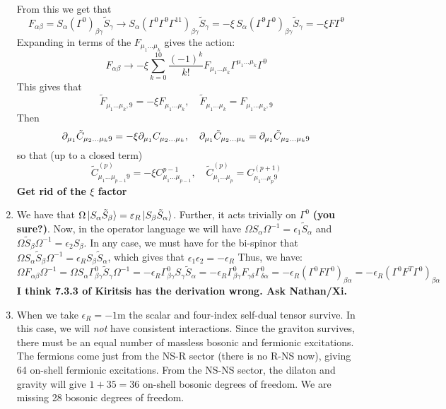 \documentclass[11pt, class=article, crop=false]{standalone}
\begin{document}
\begin{enumerate}
	From this we get that 
	\[
		F_{\alpha \beta} = S_{\alpha} (\Gamma^{0})_{\beta \gamma} \tilde S_\gamma \to S_{\alpha} (\Gamma^{0} \Gamma^{9} \Gamma^{11})_{\beta \gamma} \tilde S_\gamma = - \xi \, S_{\alpha} (\Gamma^{9} \Gamma^{0})_{\beta \gamma} \tilde S_\gamma = - \xi F \Gamma^{9}
	\]
	Expanding in terms of the $F_{\mu_1 \dots \mu_k}$ gives the action:
	\[
		F_{\alpha \beta} \to - \xi \sum_{k=0}^{10} \frac{(-1)^k}{k!} F_{\mu_1 \dots \mu_k} \Gamma^{\mu_1 \dots \mu_k} \Gamma^{9}
	\]
	This gives that
	\[
		\tilde F_{\mu_1 \dots \mu_k, 9} = - \xi F_{\mu_1 \dots \mu_k}, \quad \tilde F_{\mu_1 \dots \mu_k} = F_{\mu_1 \dots \mu_k, 9}
	\]
	Then
	\[
		\partial_{\mu_1} \tilde C_{\mu_2 \dots \mu_k 9} = -\xi \partial_{\mu_1} C_{\mu_2 \dots \mu_k}, \quad \partial_{\mu_1} \tilde C_{\mu_2 \dots \mu_k} = \partial_{\mu_1} \tilde C_{\mu_2 \dots \mu_k 9}
	\]
	so that (up to a closed term)
	\[
		\tilde C_{\mu_1 \dots \mu_{p-1} 9}^{(p)} = -\xi C_{\mu_1 \dots \mu_{p-1}}^{p-1}, \quad \tilde C^{(p)}_{\mu_1 \dots \mu_p} = C^{(p+1)}_{\mu_1 \dots \mu_p 9}
	\]
	\textbf{Get rid of the $\xi$ factor}
	
	\item We have that $\Omega \ket{S_\alpha \tilde S_\beta} = \varepsilon_R \ket{S_\beta \tilde S_\alpha}$. Further, it acts trivially on $\Gamma^0$ \textbf{(you sure?)}. Now, in the operator language we will have $\Omega S_\alpha \Omega^{-1} = \epsilon_1 \tilde S_\alpha$ and $\Omega \tilde S_\beta \Omega^{-1} = \epsilon_2 S_\beta$. In any case, we must have for the bi-spinor that $\Omega S_\alpha \tilde S_\beta \Omega^{-1} = \epsilon_R S_\beta \tilde S_\alpha$, which gives that $\epsilon_1 \epsilon_2 = -\epsilon_R$ Thus, we have:
	\[
		\Omega F_{\alpha \beta} \Omega^{-1} = \Omega S_\alpha \Gamma^0_{\beta \gamma} \tilde S_\gamma \Omega^{-1} = - \epsilon_R \Gamma^0_{\beta \gamma} S_{\gamma} \tilde S_\alpha = - \epsilon_R \Gamma^0_{\beta \gamma} F_{\gamma \delta} \Gamma^0_{\delta \alpha} = -\epsilon_R (\Gamma^0 F \Gamma^0)_{\beta \alpha} =  -\epsilon_R (\Gamma^0 F^T \Gamma^0)_{\beta \alpha }
	\]
	\textbf{I think 7.3.3 of Kiritsis has the derivation wrong. Ask Nathan/Xi.}
	\item When we take $\epsilon_R = -1$m the scalar and four-index self-dual tensor survive. In this case, we will \emph{not} have consistent interactions. Since the graviton survives, there must be an equal number of massless bosonic and fermionic excitations. The fermions come just from the NS-R sector (there is no R-NS now), giving 64 on-shell fermionic excitations. From the NS-NS sector, the dilaton and gravity will give $1+35 = 36$ on-shell bosonic degrees of freedom. We are missing 28 bosonic degrees of freedom. 
	

\end{enumerate}
\end{document}
